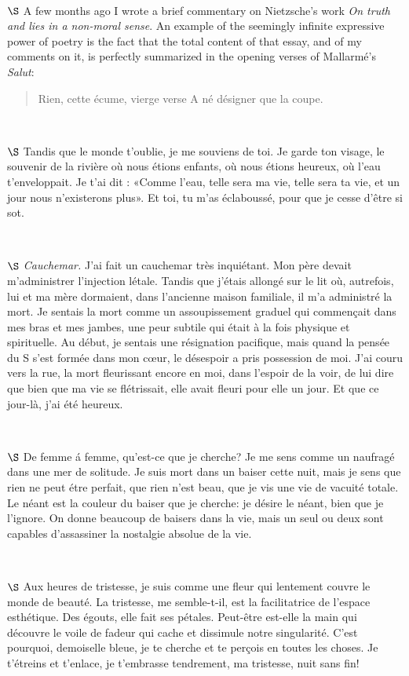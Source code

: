 \documentclass[a4paper, 12pt]{article}
\begin{document}
~ 

$\S$ A few months ago I wrote a brief commentary on Nietzsche's work \textit{On
truth and lies in a non-moral sense}. An example of the seemingly infinite
expressive power of poetry is the fact that the total content of that essay, and
of my comments on it, is perfectly summarized in the opening verses of
Mallarmé's \textit{Salut}:

\begin{quote}
    Rien, cette écume, vierge verse \newline 
    A né désigner que la coupe.
\end{quote}

~ 

$\S$ Tandis que le monde t'oublie, je me souviens de toi. Je garde ton visage, le
souvenir de la rivière où nous étions enfants, où nous étions heureux, où l'eau
t'enveloppait. Je t'ai dit : «Comme l'eau, telle sera ma vie, telle sera ta
vie, et un jour nous n'existerons plus». Et toi, tu m'as éclaboussé, pour que je
cesse d'être si sot.

~ 



$\S$ \textit{Cauchemar.} 
J'ai fait un cauchemar très inquiétant. Mon père devait
m'administrer l'injection létale. Tandis que j'étais allongé sur le lit où,
autrefois, lui et ma mère dormaient, dans l'ancienne maison familiale, il m'a
administré la mort. Je sentais la mort comme un assoupissement graduel qui
commençait dans mes bras et mes jambes, une peur subtile qui était à la fois
physique et spirituelle. Au début, je sentais une résignation pacifique, mais quand
la pensée du S s'est formée dans mon cœur, le désespoir a pris possession de moi.
J'ai couru vers la rue, la mort fleurissant encore en moi, dans l'espoir de la voir,
de lui dire que bien que ma vie se flétrissait, elle avait fleuri pour elle un jour.
Et que ce jour-là, j'ai été heureux.

~ 

$\S$ De femme á femme, qu'est-ce que je cherche? Je me sens comme un naufragé
dans une mer de solitude. Je suis mort dans un baiser cette nuit, mais je sens
que rien ne peut étre perfait, que rien n'est beau, que je vis une vie de
vacuité totale. Le néant est la couleur du baiser que je cherche: je désire le
néant, bien que je l'ignore. On donne beaucoup de baisers dans la vie, mais un
seul ou deux sont capables d'assassiner la nostalgie absolue de la vie.

~ 

$\S$ Aux heures de tristesse, je suis comme une fleur qui lentement couvre le
monde de beauté. La tristesse, me semble-t-il, est la facilitatrice de l'espace esthétique. Des
égouts, elle fait ses pétales. Peut-être est-elle la main qui découvre le voile
de fadeur qui cache et dissimule notre singularité. C'est pourquoi, demoiselle
bleue, je te cherche et te perçois en toutes les choses. Je t'étreins et
t'enlace, je t'embrasse tendrement, ma tristesse, nuit sans fin!
\end{document}
